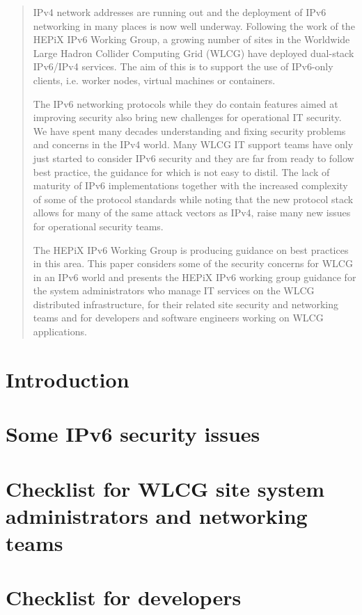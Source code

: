 \documentclass[a4paper]{jpconf}
\begin{document}
\begin{abstract}
IPv4 network addresses are running out and the deployment of IPv6 networking in many places is now well underway. Following the work of the HEPiX IPv6 Working Group, a growing number of sites in the Worldwide Large Hadron Collider Computing Grid (WLCG) have deployed dual-stack IPv6/IPv4 services. The aim of this is to support the use of IPv6-only clients, i.e. worker nodes, virtual machines or containers.
\par
The IPv6 networking protocols while they do contain features aimed at improving security also bring new challenges for operational IT security. We have spent many decades understanding and fixing security problems and concerns in the IPv4 world. Many WLCG IT support teams have only just started to consider IPv6 security and they are far from ready to follow best practice, the guidance for which is not easy to distil. The lack of maturity of IPv6 implementations together with the increased complexity of some of the protocol standards while noting that the new protocol stack allows for many of the same attack vectors as IPv4, raise many new issues for operational security teams.
\par
The HEPiX IPv6 Working Group is producing guidance on best practices in this area. This paper considers some of the security concerns for WLCG in an IPv6 world and presents the HEPiX IPv6 working group guidance for the system administrators who manage IT services  on the WLCG distributed infrastructure, for their related site security and networking teams and for developers and software engineers working on WLCG applications.
\end{abstract}

\section{Introduction}


\section{Some IPv6 security issues}


\section{Checklist for WLCG site system administrators and networking teams}


\section{Checklist for developers}



\par

\end{document}
